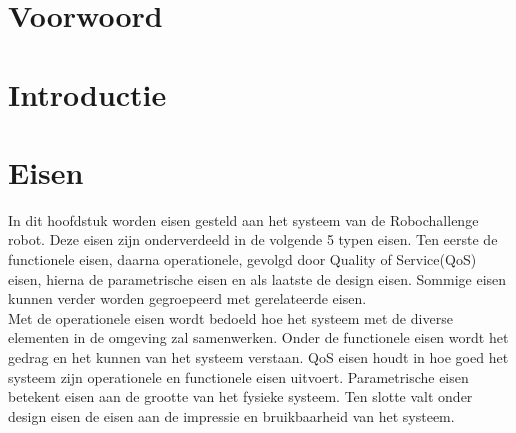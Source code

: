 \documentclass[12pt]{article} %
\begin{document}
\clearpage
\section*{Voorwoord}
\lipsum[0-2]
\newpage
\tableofcontents
\newpage
{}
\clearpage
\section{Introductie}
\label{sec:introduction}
\lipsum[0-3]
\newpage

\section{Eisen}
\label{sec:requirements}
In dit hoofdstuk worden eisen gesteld aan het systeem van de Robochallenge robot. Deze eisen zijn onderverdeeld in de volgende 5 typen eisen. Ten eerste de functionele eisen, daarna operationele, gevolgd door Quality of Service(QoS) eisen, hierna de parametrische eisen en als laatste de design eisen. Sommige eisen kunnen verder worden gegroepeerd met gerelateerde eisen.\\
Met de operationele eisen wordt bedoeld hoe het systeem met de diverse elementen in de omgeving zal samenwerken. 
Onder de functionele eisen wordt het gedrag en het kunnen van het systeem verstaan.
QoS eisen houdt in hoe goed het systeem zijn operationele en functionele eisen uitvoert.
Parametrische eisen betekent eisen aan de grootte van het fysieke systeem. 
Ten slotte valt onder design eisen de eisen aan de impressie en bruikbaarheid van het systeem.
\end{document}
